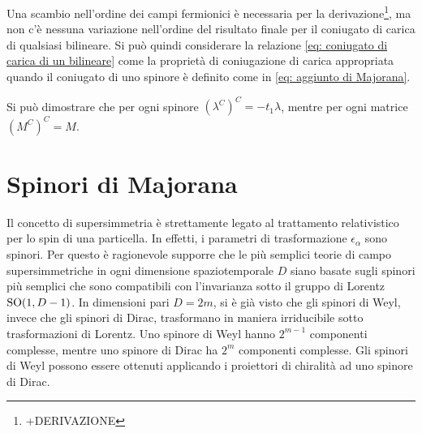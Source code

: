 Una scambio nell'ordine dei campi fermionici è necessaria per la derivazione\footnote{+DERIVAZIONE}, ma non c'è nessuna variazione nell'ordine del risultato finale per il coniugato di carica di qualsiasi bilineare. Si può quindi considerare la relazione \eqref{eq: coniugato di carica di un bilineare} come la proprietà di coniugazione di carica appropriata quando il coniugato di uno spinore è definito come in \eqref{eq: aggiunto di Majorana}. 
\begin{obs}
    Si può dimostrare che per ogni spinore $(\lambda^C)^C = -t_1\lambda$, mentre per ogni matrice $(M^C)^C = M$.
\end{obs}


\section{Spinori di Majorana}
Il concetto di supersimmetria è strettamente legato al trattamento relativistico per lo spin di una particella. In effetti, i parametri di trasformazione $\epsilon_\alpha$ sono spinori. Per questo è ragionevole supporre che le più semplici teorie di campo supersimmetriche in ogni dimensione spaziotemporale $D$ siano basate sugli spinori più semplici che sono compatibili con l'invarianza sotto il gruppo di Lorentz $\mathrm{SO}(1, D - 1)$. In dimensioni pari $D = 2m$, si è già visto che gli spinori di Weyl, invece che gli spinori di Dirac, trasformano in maniera irriducibile sotto trasformazioni di Lorentz. Uno spinore di Weyl hanno $2^{m - 1}$ componenti complesse, mentre uno spinore di Dirac ha $2^m$ componenti complesse. Gli spinori di Weyl possono essere ottenuti applicando i proiettori di chiralità ad uno spinore di Dirac.


